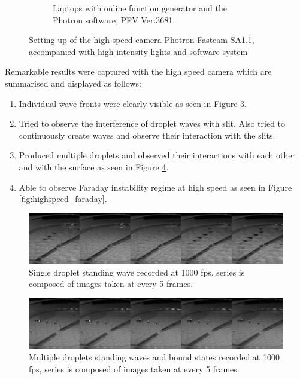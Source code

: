 \begin{figure}[ht]
\begin{subfigure}[t]{0.5\textwidth}
        \caption{Laptops with online function generator and the Photron software, PFV Ver.3681.}
        \label{fig:software_highspeedcamera}
    \end{subfigure}
\caption{Setting up of the high speed camera Photron Fastcam SA1.1, accompanied with high intensity lights and software system}
\label{fig:highspeed_setup}
\end{figure}

Remarkable results were captured with the high speed camera which are summarised and displayed as follows:
\begin{enumerate}
\item  Individual wave fronts were clearly visible as seen in Figure \ref{fig:highspeed_wave}.
\item  Tried to observe the interference of droplet waves with slit. Also  tried to continuously create waves and observe their interaction with  the slits.
\item  Produced multiple droplets and observed their interactions with each  other and with the surface as seen in Figure \ref{fig:highspeed_multiple}.
\item  Able to observe Faraday instability regime at high speed as seen in  Figure \ref{fig:highspeed_faraday}.
\end{enumerate}

\begin{figure}[htb]
\includegraphics[width=\textwidth]{prototype/exp_rep_imgs/highspeed_wave.jpg}
\centering
\caption{Single droplet standing wave recorded at 1000 fps, series is composed of images taken at every 5 frames.}
\centering
\label{fig:highspeed_wave}
\end{figure}

\begin{figure}[htb]
\includegraphics[width=\textwidth]{prototype/exp_rep_imgs/highspeed_multiple.jpg}
\centering
\caption{Multiple droplets standing waves and bound states recorded at 1000 fps, series is composed of images taken at every 5 frames.}
\centering
\label{fig:highspeed_multiple}
\end{figure}

